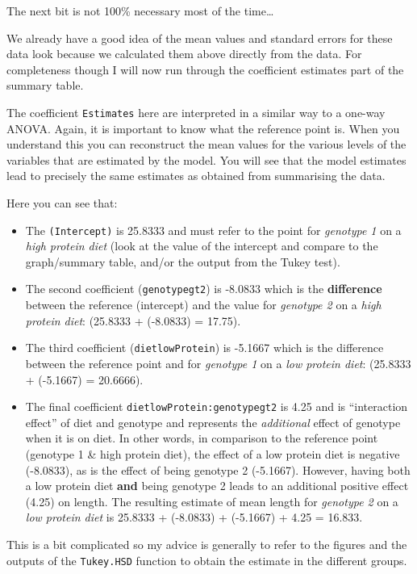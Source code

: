 \documentclass[
  a4paperpaper,
]{book}
\begin{document}
The next bit is not 100\% necessary most of the time\ldots{}

We already have a good idea of the mean values and standard errors for these data look because we calculated them above directly from the data. For completeness though I will now run through the coefficient estimates part of the summary table.

The coefficient \texttt{Estimates} here are interpreted in a similar way to a one-way ANOVA. Again, it is important to know what the reference point is. When you understand this you can reconstruct the mean values for the various levels of the variables that are estimated by the model. You will see that the model estimates lead to precisely the same estimates as obtained from summarising the data.

Here you can see that:

\begin{itemize}
\item
  The \texttt{(Intercept)} is 25.8333 and must refer to the point for \emph{genotype 1} on a \emph{high protein diet} (look at the value of the intercept and compare to the graph/summary table, and/or the output from the Tukey test).
\item
  The second coefficient (\texttt{genotypegt2}) is -8.0833 which is the \textbf{difference} between the reference (intercept) and the value for \emph{genotype 2} on a \emph{high protein diet}: (25.8333 + (-8.0833) = 17.75).
\item
  The third coefficient (\texttt{dietlowProtein}) is -5.1667 which is the difference between the reference point and for \emph{genotype 1} on a \emph{low protein diet}: (25.8333 + (-5.1667) = 20.6666).
\item
  The final coefficient \texttt{dietlowProtein:genotypegt2} is 4.25 and is ``interaction effect'' of diet and genotype and represents the \emph{additional} effect of genotype when it is on diet. In other words, in comparison to the reference point (genotype 1 \& high protein diet), the effect of a low protein diet is negative (-8.0833), as is the effect of being genotype 2 (-5.1667). However, having both a low protein diet \textbf{and} being genotype 2 leads to an additional positive effect (4.25) on length. The resulting estimate of mean length for \emph{genotype 2} on a \emph{low protein diet} is 25.8333 + (-8.0833) + (-5.1667) + 4.25 = 16.833.
\end{itemize}

This is a bit complicated so my advice is generally to refer to the figures and the outputs of the \texttt{Tukey.HSD} function to obtain the estimate in the different groups.
\end{document}
